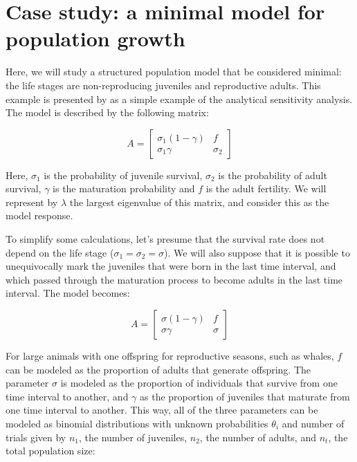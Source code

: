 \documentclass[twoside,12pt,a4paper]{article}
\begin{document}
\section[Case study]{Case study: a minimal model for population growth}

Here, we will study a structured population model that be considered minimal:
the life stages are non-reproducing juveniles and reproductive adults. This example 
is presented by \citep{Caswell08} as a simple example of the analytical sensitivity analysis. The model
is described by the following matrix:

\begin{equation}
 A = \left[
 \begin{array}{ll}
	 \sigma_1 (1-\gamma) &   f \\
     \sigma_1 \gamma & \sigma_2
 \end{array}
 \right]
\end{equation}

Here, $\sigma_1$ is the probability of juvenile survival, $\sigma_2$ is the probability of adult survival,
$\gamma$ is the maturation probability and $f$ is the adult fertility. We will represent by $\lambda$ the
largest eigenvalue of this matrix, and consider this as the model response.

To simplify some calculations, let's presume that the survival rate does not depend on the life stage
($\sigma_1=\sigma_2=\sigma$). We will also suppose that it is possible to unequivocally mark the juveniles
that were born in the last time interval, and which passed through the maturation process to become adults
in the last time interval. The model becomes:

\begin{equation}
 A = \left[
 \begin{array}{ll}
	 \sigma (1-\gamma) &   f \\
     \sigma \gamma & \sigma
 \end{array}
 \right]
\end{equation}

For large animals with one offspring for reproductive seasons, such as whales, $f$ can be modeled as the
proportion of adults that generate offspring. The parameter $\sigma$ is modeled as the proportion of 
individuals that survive from one time interval to another, and $\gamma$ as the proportion of juveniles that
maturate from one time interval to another. This way, all of the three parameters can be modeled as
binomial distributions with unknown probabilities 
$\theta_i$ and number of trials given by 
$n_1$, the number of juveniles, $n_2$, the number of adults, and $n_t$, the total population size:
\end{document}

